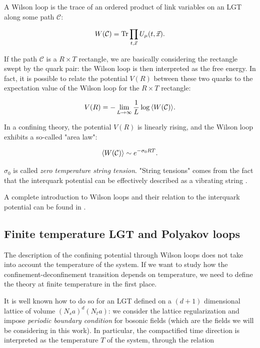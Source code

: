 \documentclass[reqno,12pt]{article}
\numberwithin{equation}{section}
\begin{document}
A Wilson loop is the trace of an ordered product of link variables on an LGT along some path $\mathcal{C}$:

\begin{equation}
	W(\mathcal{C}) = \Tr \prod_{t, \vec{x}} U_\mu(t, \vec{x}).
\end{equation}

If the path $\mathcal{C}$ is a $R \times T$ rectangle, we are basically considering the rectangle swept by the quark pair: the Wilson
loop is then interpreted as the free energy. In fact, it is possible to relate the potential $V(R)$ 
between these two quarks to the expectation value of the Wilson loop for the $R \times T$ rectangle:

\begin{equation}
	V(R) = - \lim_{L\rightarrow\infty} \frac{1}{L} \log{\expval{W(\mathcal{C})}}.
\end{equation}

In a confining theory, the potential $V(R)$ is linearly rising, and the Wilson loop exhibits a so-called "area law":

\begin{equation} \label{eq:arealaw}
	\expval{W(\mathcal{C})} \sim e^{-\sigma_0 R T}.
\end{equation}

$\sigma_0$ is called \textit{zero temperature string tension}. "String tensions" comes from the fact that the interquark 
potential can be effectively described as a vibrating string \cite{caselle}.


A complete introduction to Wilson loops and their relation to the interquark potential can be found in \cite{gattringer}. 

\subsection{Finite temperature LGT and Polyakov loops}
The description of the confining potential through Wilson loops does not take into account the temperature of the system.
If we want to study how the confinement-deconfinement transition depends on temperature, we need to define the theory at finite
temperature in the first place. 

It is well known how to do so for an LGT defined on a $(d+1)$ dimensional lattice of volume $(N_s a)^d(N_t a)$:
we consider the lattice regularization and impose \textit{periodic boundary condition} 
for bosonic fields (which are the fields we will be considering in this work). In particular, the compactified time direction
is interpreted as the temperature $T$ of the system, through the relation
\end{document}
